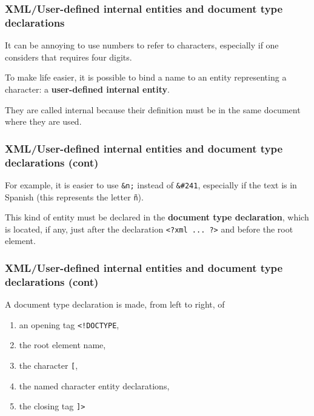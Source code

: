 %
\begin{frame}[containsverbatim]
\frametitle{XML/User-defined internal entities and document type declarations}

It can be annoying to use numbers to refer to characters, especially
if one considers that \Unicode requires four digits.

\bigskip

To make life easier, it is possible to bind a name to an entity
representing a character: a \textbf{user-defined internal entity}.

\bigskip

They are called internal because their definition must be in the same
document where they are used.

\end{frame}


%
\begin{frame}[containsverbatim]
\frametitle{XML/User-defined internal entities and document type declarations (cont)}

For example, it is easier to use \verb|&n;| instead of \verb|&#241|,
especially if the text is in Spanish (this represents the letter
\texttt{\~{n}}).

\bigskip

This kind of entity must be declared in the \textbf{document type
declaration}, which is located, if any, just after the declaration
\verb|<?xml ... ?>| and before the root element.

\end{frame}

%
\begin{frame}[containsverbatim]
\frametitle{XML/User-defined internal entities and document type declarations
  (cont)}
\label{xml_intro:DOCTYPE}

A document type declaration is made, from left to right, of
\begin{enumerate}

  \item an opening tag \verb|<!DOCTYPE|,

  \item the root element name,

  \item the character \verb|[|,

  \item the named character entity declarations,

  \item the closing tag \verb|]>|

\end{enumerate}

\end{frame}

